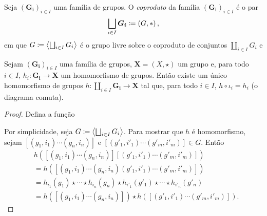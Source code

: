 \begin{defi}
Seja $(\bm{G_i})_{i \in I}$ uma família de grupos. O \emph{coproduto} da família $(\bm{G_i})_{i \in I}$ é o par
	\begin{equation*}
	\coprod_{i \in I} \bm{G_i} \coloneqq \left(G,\opb \right),
	\end{equation*}
em que $G \coloneqq \ger{\coprod_{i \in I} G_i}$ é o grupo livre sobre o coproduto de conjuntos $\coprod_{i \in I} G_i$ e 
\end{defi}

\begin{prop}
Sejam $(\bm{G_i})_{i \in I}$ uma família de grupos, $\bm X = (X,\star)$ um grupo e, para todo $i \in I$, $h_i: \bm{G_i} \to \bm X$ um homomorfismo de grupos. Então existe um único homomorfismo de grupos $h: \coprod_{i \in I} \bm{G_i} \to \bm X$ tal que, para todo $i \in I$, $h \circ \iota_i = h_i$ (o diagrama comuta).
\begin{figure}
\centering
{}
\end{figure}
\end{prop}
\begin{proof}
Defina a função 

Por simplicidade, seja $G \coloneqq \ger{\coprod_{i \in I} G_i}$. Para mostrar que $h$ é homomorfismo, sejam $[(g_1,i_1) \cdots (g_n,i_n)]$ e $[(g'_1,i'_1) \cdots (g'_m,i'_m)] \in G$. Então
	\begin{align*}
	&h([(g_1,i_1) \cdots (g_n,i_n)][(g'_1,i'_1) \cdots (g'_m,i'_m)]) \\
		&= h([(g_1,i_1) \cdots (g_n,i_n)(g'_1,i'_1) \cdots (g'_m,i'_m)]) \\
		&= h_{i_1}(g_1) \star \cdots \star h_{i_n}(g_n) \star h_{i'_1}(g'_1) \star \cdots \star h_{i'_n}(g'_n) \\
		&= h([(g_1,i_1) \cdots (g_n,i_n)]) \star h([(g'_1,i'_1) \cdots (g'_m,i'_m)]).
	\end{align*}
\end{proof}
